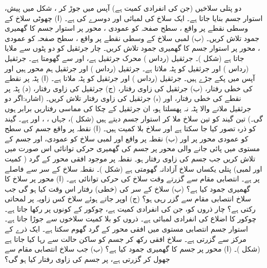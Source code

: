 دو پتلی سلاخیں  (جن کی انفرادی کمیت  ہے) آپس میں جوڑ کر ، شکل  میں پیش،  استوار جسم بنایا جاتا ہے۔ ایک سلاخ کی لمبائی  اور دوسرے کی  ہے۔ (ا)  چھوٹی سلاخ کے وسطی نقطے پر واقع ، سطح  صفحہ کو عمودی ، محور پر  استوار جسم کا گھمیری جمود تلاش کریں۔ (ب)    لمبی  سلاخ کے وسطی نقطے پر واقع ، سطح  صفحہ کو عمودی ، محور پر  استوار جسم کا گھمیری جمود تلاش کریں۔
چار جرثقیل  کو دو  پٹوں  سے ملایا جاتا ہے (شکل )۔ جرثقیل  (رداس )  محرک  جرثقیل ہے، اور  سے گھومتا ہے۔ جرثقیل  (رداس ) اور جرثقیل  کو پٹہ  ملاتا ہے۔ جرثقیل  (رداس )  اور جرثقیل  ہم محور ہیں   اور آپس میں پکے جڑے ہیں۔ جرثقیل  (رداس )   اور جرثقیل  کو پٹہ  ملاتا ہے۔ (ا)  پٹہ  پر نقطے کی خطی  رفتار، (ب) جرثقیل  کی زاوی رفتار، (ج) جرثقیل  کی زاوی رفتار، (د)  پٹہ  پر نقطے کی خطی رفتار، اور (ہ) جرثقیل  کی زاوی رفتار تلاش کریں۔ (اشارہ:اگر دو   جرثقیل  ملانے والا  پٹہ نہ پھسلتا ہو، ان جرثقیل کے چکا کی مماسی رفتاریں  برابر ہوں  گی۔)
تین گیند  کو تین سلاخ ملا کر استوار جسم  دیتے  ہیں (شکل )، جہاں ، ، اور  ہے۔ گیند کو ذرہ تصور کیا جا سکتا ہے اور سلاخ بلا کمیت ہیں۔ (ا) نقطہ  پر واقع  جسم کی سطح کو عمودی محور پر اور (ب) نقطہ  پر واقع اور  لمبی سلاخ  کو عمودی، اور جسم کے مستوی میں پائی جانے والی محور پر جسم کی گھمیری حرکی توانائی اس صورت میں تلاش کریں جب جسم  کی زاوی رفتار  ہو۔
نقطہ  پر موجود افقی محور کے گرد  ( کمیت اور  لمبی)  پتلی یکساں سلاخ آزادانہ  گھومتی ہے (شکل )۔ نقطہ  سلاخ کے  سر سے  فاصلے پر ہے۔ انتصابی مقام سے گزرتے وقت سلاخ کی حرکی توانائی  ہے۔ (ا)  محور  پر سلاخ کا گھمیری جمود کیا ہے؟ (ب)  سلاخ کے سر  کی (خطی) رفتار  اس وقت کیا ہو گی جب سلاخ انتصابی مقام سے گزر رہی ہو؟ (ج)  اوپر جاتے ہوئے سلاخ کس زاویہ  پر لمحاتی رکتی ہے؟
چار ذروں کو، جن کی انفرادی کمیت  ہے، چوکور کے کونوں پر رکھا جاتا ہے۔ چوکور کا اضلاع کی انفرادی لمبائی  ہے۔ ذروں کو بلا کمیت سلاخوں سے جوڑا جاتا ہے۔ استوار جسم انتصابی مستوی میں افقی   محور   کے گرد گھوم سکتا ہے۔  ایک ذرے کے مرکز سے گزرتی ہے۔ سلاخ  افقی رکھ کر جسم کو ساکن حالت سے رہا کیا جاتا ہے (شکل )۔ (ا)  محور  پر جسم کا گھمیری جمود کیا ہے؟ (ب)  جب سلاخ  انتصابی مقام سے جھول کر گزرتی ہے،   پر جسم کی زاوی رفتار کیا ہو گی؟
